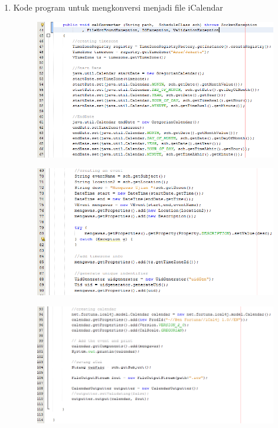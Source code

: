 \begin{enumerate}
\begin{figure}[H]
		\end{figure}
	\item Kode program untuk mengkonversi menjadi file iCalendar
		\begin{figure}[H]
		\includegraphics[scale=0.8]{Gambar/calConverter1}
		\end{figure}
		\begin{figure}[H]
		\includegraphics[scale=0.8]{Gambar/calConverter2}
		\end{figure}
		\begin{figure}[H]
		\includegraphics[scale=0.8]{Gambar/calConverter3}

\end{figure}
\end{enumerate}
